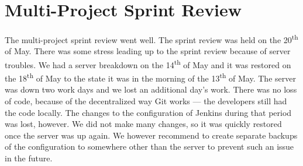 \section{Multi-Project Sprint Review}\label{sec:s4_multiprj_review}
The multi-project sprint review went well. The sprint review was held on the 20\textsuperscript{th} of May. There was some stress leading up to the sprint review because of server troubles. We had a server breakdown on the 14\textsuperscript{th} of May and it was restored on the 18\textsuperscript{th} of May to the state it was in the morning of the 13\textsuperscript{th} of May. The server was down two work days and we lost an additional day's work. There was no loss of code, because of the decentralized way Git works --- the developers still had the code locally. The changes to the configuration of Jenkins during that period was lost, however. We did not make many changes, so it was quickly restored once the server was up again. We however recommend to create separate backups of the configuration to somewhere other than the server to prevent such an issue in the future.